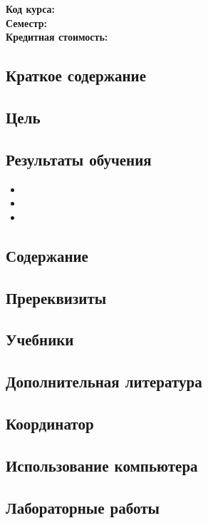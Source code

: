 \documentclass[a4paper,12pt]{article}
\newcommand{\CourseName}{}
\newcommand{\CourseCode}{}
\newcommand{\Semester}{}
\newcommand{\Credits}{}
\newcommand{\CourseDescription}{}
\newcommand{\CourseGoal}{}
\newcommand{\LearningOutcomeOne}{}
\newcommand{\LearningOutcomeTwo}{}
\newcommand{\LearningOutcomeThree}{}
\newcommand{\CourseContent}{}
\newcommand{\Prerequisites}{}
\newcommand{\MainBook}{}
\newcommand{\AdditionalBooks}{}
\newcommand{\Coordinator}{}
\newcommand{\ComputerUsage}{}
\newcommand{\Labs}{}
\begin{document}
\section*{\CourseName}
\textbf{Код курса:} \CourseCode\\
\textbf{Семестр:} \Semester\\
\textbf{Кредитная стоимость:} \Credits

\subsection*{Краткое содержание}
\CourseDescription

\subsection*{Цель}
\CourseGoal

\subsection*{Результаты обучения}
\begin{itemize}
    \item \LearningOutcomeOne
    \item \LearningOutcomeTwo
    \item \LearningOutcomeThree
\end{itemize}

\subsection*{Содержание}
\begin{enumerate}
    \CourseContent
\end{enumerate}

\subsection*{Пререквизиты}
\Prerequisites

\subsection*{Учебники}
\MainBook

\subsection*{Дополнительная литература}
\AdditionalBooks

\subsection*{Координатор}
\Coordinator

\subsection*{Использование компьютера}
\ComputerUsage

\subsection*{Лабораторные работы}
\Labs
\end{document}
